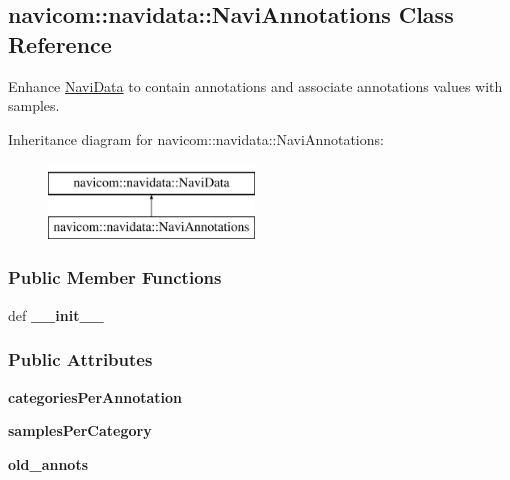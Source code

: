 \hypertarget{classnavicom_1_1navidata_1_1NaviAnnotations}{
\subsection{navicom::navidata::NaviAnnotations Class Reference}
\label{classnavicom_1_1navidata_1_1NaviAnnotations}
}


Enhance \hyperlink{classnavicom_1_1navidata_1_1NaviData}{NaviData} to contain annotations and associate annotations values with samples.  


Inheritance diagram for navicom::navidata::NaviAnnotations:\begin{figure}[H]
\begin{center}
\leavevmode
\includegraphics[height=2.000000cm]{classnavicom_1_1navidata_1_1NaviAnnotations}
\end{center}
\end{figure}
\subsubsection*{Public Member Functions}
\begin{DoxyCompactItemize}
\item 
\hypertarget{classnavicom_1_1navidata_1_1NaviAnnotations_a213947a92d3df83acab69c98df419865}{
def {\bfseries \_\-\_\-init\_\-\_\-}}
\label{classnavicom_1_1navidata_1_1NaviAnnotations_a213947a92d3df83acab69c98df419865}

\end{DoxyCompactItemize}
\subsubsection*{Public Attributes}
\begin{DoxyCompactItemize}
\item 
\hypertarget{classnavicom_1_1navidata_1_1NaviAnnotations_a1c26e115cb2eabe4384cd2fa0c7f776f}{
{\bfseries categoriesPerAnnotation}}
\label{classnavicom_1_1navidata_1_1NaviAnnotations_a1c26e115cb2eabe4384cd2fa0c7f776f}

\item 
\hypertarget{classnavicom_1_1navidata_1_1NaviAnnotations_a7cbb4ab623948f19e055f5b4b7c938a9}{
{\bfseries samplesPerCategory}}
\label{classnavicom_1_1navidata_1_1NaviAnnotations_a7cbb4ab623948f19e055f5b4b7c938a9}

\item 
\hypertarget{classnavicom_1_1navidata_1_1NaviAnnotations_ab053ca65505c1a9d72e2afb96ddcae9c}{
{\bfseries old\_\-annots}}
\label{classnavicom_1_1navidata_1_1NaviAnnotations_ab053ca65505c1a9d72e2afb96ddcae9c}

\end{DoxyCompactItemize}


